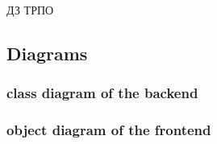 ДЗ ТРПО

\subsection*{Diagrams}

\subsubsection*{class diagram of the backend}



\subsubsection*{object diagram of the frontend}

 